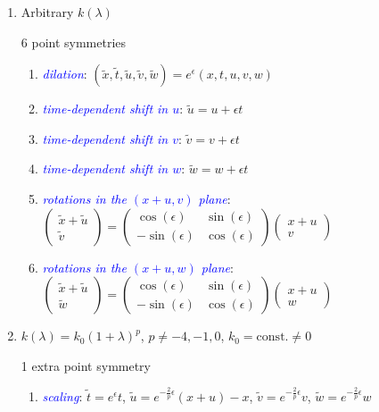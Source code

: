 \documentclass[landscape]{slides}
\def\myemph#1{\textcolor{blue}{\em #1}}
\def\const{\text{const.}}
\begin{document}
\begin{enumerate}
\item 
Arbitrary $k(\lambda)$

6 point symmetries 

\begin{enumerate}[label=\roman*.]
\item 
\myemph{dilation}:  
$ (\tilde x,\tilde t,\tilde u,\tilde v,\tilde w) = e^{\epsilon} (x,t,u,v,w)$
\item
\myemph{time-dependent shift in $u$}:  
$\tilde u =u + \epsilon t$
\item
\myemph{time-dependent shift in $v$}:  
$\tilde v =v + \epsilon t$
\item
\myemph{time-dependent shift in $w$}:  
$\tilde w =w + \epsilon t$
\item 
\myemph{rotations in the $(x+u,v)$ plane}: \\
$\begin{pmatrix} \tilde x + \tilde u \\ \tilde v  \end{pmatrix}
= 
\begin{pmatrix}
\cos(\epsilon) & \sin(\epsilon) \\
-\sin(\epsilon) & \cos(\epsilon)
\end{pmatrix}
\begin{pmatrix} x + u \\ v \end{pmatrix}$
\item 
\myemph{rotations in the $(x+u,w)$ plane}: \\
$\begin{pmatrix} \tilde x + \tilde u \\ \tilde w  \end{pmatrix}
= 
\begin{pmatrix}
\cos(\epsilon) & \sin(\epsilon) \\
-\sin(\epsilon) & \cos(\epsilon)
\end{pmatrix}
\begin{pmatrix} x + u \\ w \end{pmatrix}$
\end{enumerate}

\newpage

\item 
$k(\lambda) = k_0 (1+\lambda)^{p}$,
\quad
$p \neq -4, -1, 0$, 
\quad
$k_0 = \const \neq 0$

1 extra point symmetry

\begin{enumerate}[label=\roman*.]
\item 
\myemph{scaling}: 
$\tilde t = e^{\epsilon} t$,
$\tilde u = e^{-\frac{2}{p}\epsilon} (x+u) - x$,
$\tilde v = e^{-\frac{2}{p} \epsilon} v$,
$\tilde w = e^{-\frac{2}{p} \epsilon} w$\\


\end{enumerate}
\end{enumerate}
\end{document}
